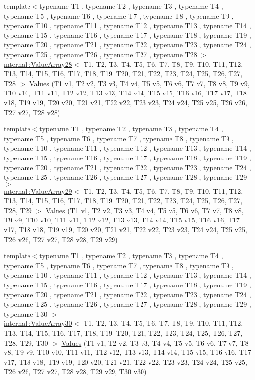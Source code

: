 \begin{DoxyCompactItemize}
\item 
{\footnotesize template$<$typename T1 , typename T2 , typename T3 , typename T4 , typename T5 , typename T6 , typename T7 , typename T8 , typename T9 , typename T10 , typename T11 , typename T12 , typename T13 , typename T14 , typename T15 , typename T16 , typename T17 , typename T18 , typename T19 , typename T20 , typename T21 , typename T22 , typename T23 , typename T24 , typename T25 , typename T26 , typename T27 , typename T28 $>$ }\\\mbox{\hyperlink{classtesting_1_1internal_1_1ValueArray28}{internal\+::\+Value\+Array28}}$<$ T1, T2, T3, T4, T5, T6, T7, T8, T9, T10, T11, T12, T13, T14, T15, T16, T17, T18, T19, T20, T21, T22, T23, T24, T25, T26, T27, T28 $>$ \mbox{\hyperlink{namespacetesting_a5785254e0510108d9d422e32ba18f170}{Values}} (T1 v1, T2 v2, T3 v3, T4 v4, T5 v5, T6 v6, T7 v7, T8 v8, T9 v9, T10 v10, T11 v11, T12 v12, T13 v13, T14 v14, T15 v15, T16 v16, T17 v17, T18 v18, T19 v19, T20 v20, T21 v21, T22 v22, T23 v23, T24 v24, T25 v25, T26 v26, T27 v27, T28 v28)
\item 
{\footnotesize template$<$typename T1 , typename T2 , typename T3 , typename T4 , typename T5 , typename T6 , typename T7 , typename T8 , typename T9 , typename T10 , typename T11 , typename T12 , typename T13 , typename T14 , typename T15 , typename T16 , typename T17 , typename T18 , typename T19 , typename T20 , typename T21 , typename T22 , typename T23 , typename T24 , typename T25 , typename T26 , typename T27 , typename T28 , typename T29 $>$ }\\\mbox{\hyperlink{classtesting_1_1internal_1_1ValueArray29}{internal\+::\+Value\+Array29}}$<$ T1, T2, T3, T4, T5, T6, T7, T8, T9, T10, T11, T12, T13, T14, T15, T16, T17, T18, T19, T20, T21, T22, T23, T24, T25, T26, T27, T28, T29 $>$ \mbox{\hyperlink{namespacetesting_a3d8a9bd3f027d89ff2873e3f0ff396cb}{Values}} (T1 v1, T2 v2, T3 v3, T4 v4, T5 v5, T6 v6, T7 v7, T8 v8, T9 v9, T10 v10, T11 v11, T12 v12, T13 v13, T14 v14, T15 v15, T16 v16, T17 v17, T18 v18, T19 v19, T20 v20, T21 v21, T22 v22, T23 v23, T24 v24, T25 v25, T26 v26, T27 v27, T28 v28, T29 v29)
\item 
{\footnotesize template$<$typename T1 , typename T2 , typename T3 , typename T4 , typename T5 , typename T6 , typename T7 , typename T8 , typename T9 , typename T10 , typename T11 , typename T12 , typename T13 , typename T14 , typename T15 , typename T16 , typename T17 , typename T18 , typename T19 , typename T20 , typename T21 , typename T22 , typename T23 , typename T24 , typename T25 , typename T26 , typename T27 , typename T28 , typename T29 , typename T30 $>$ }\\\mbox{\hyperlink{classtesting_1_1internal_1_1ValueArray30}{internal\+::\+Value\+Array30}}$<$ T1, T2, T3, T4, T5, T6, T7, T8, T9, T10, T11, T12, T13, T14, T15, T16, T17, T18, T19, T20, T21, T22, T23, T24, T25, T26, T27, T28, T29, T30 $>$ \mbox{\hyperlink{namespacetesting_a016767be70ad0412bdbf837bc4d3ca98}{Values}} (T1 v1, T2 v2, T3 v3, T4 v4, T5 v5, T6 v6, T7 v7, T8 v8, T9 v9, T10 v10, T11 v11, T12 v12, T13 v13, T14 v14, T15 v15, T16 v16, T17 v17, T18 v18, T19 v19, T20 v20, T21 v21, T22 v22, T23 v23, T24 v24, T25 v25, T26 v26, T27 v27, T28 v28, T29 v29, T30 v30)

\end{DoxyCompactItemize}
